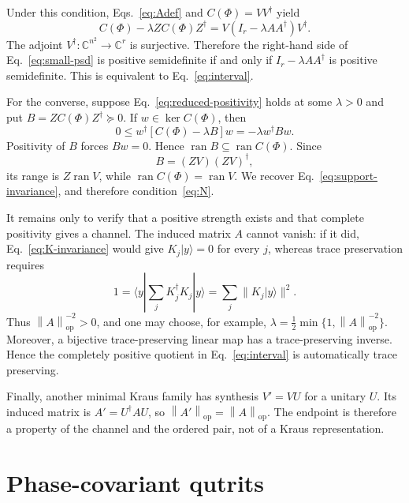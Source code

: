\documentclass[aip,jmp,preprint]{revtex4-2}
\newcommand{\ran}{\operatorname{ran}}
\newcommand{\opnorm}[1]{\left\lVert #1\right\rVert_{\mathrm{op}}}
\begin{document}
Under this condition, Eqs.~\eqref{eq:Adef} and $C(\Phi)=VV^\dagger$ yield
\begin{equation}
 C(\Phi)-\lambda ZC(\Phi)Z^\dagger
 =V(I_r-\lambda AA^\dagger)V^\dagger . \label{eq:small-psd}
\end{equation}
The adjoint $V^\dagger:\mathbb C^{n^2}\to\mathbb C^r$ is surjective.  Therefore the right-hand side of Eq.~\eqref{eq:small-psd} is positive semidefinite if and only if $I_r-\lambda AA^\dagger$ is positive semidefinite.  This is equivalent to Eq.~\eqref{eq:interval}.

For the converse, suppose Eq.~\eqref{eq:reduced-positivity} holds at some $\lambda>0$ and put $B=ZC(\Phi)Z^\dagger\succeq0$.  If $w\in\ker C(\Phi)$, then
\begin{equation}
 0\leq w^\dagger[C(\Phi)-\lambda B]w
 =-\lambda w^\dagger Bw .
\end{equation}
Positivity of $B$ forces $Bw=0$.  Hence $\ran B\subseteq\ran C(\Phi)$.  Since
\begin{equation}
 B=(ZV)(ZV)^\dagger,
\end{equation}
its range is $Z\ran V$, while $\ran C(\Phi)=\ran V$.  We recover Eq.~\eqref{eq:support-invariance}, and therefore condition~\eqref{eq:N}.

It remains only to verify that a positive strength exists and that complete positivity gives a channel.  The induced matrix $A$ cannot vanish: if it did, Eq.~\eqref{eq:K-invariance} would give $K_j|y\rangle=0$ for every $j$, whereas trace preservation requires
\begin{equation}
 1=\langle y|\sum_jK_j^\dagger K_j|y\rangle
 =\sum_j\|K_j|y\rangle\|^2 .
\end{equation}
Thus $\opnorm{A}^{-2}>0$, and one may choose, for example, $\lambda=\tfrac12\min\{1,\opnorm{A}^{-2}\}$.  Moreover, a bijective trace-preserving linear map has a trace-preserving inverse.  Hence the completely positive quotient in Eq.~\eqref{eq:interval} is automatically trace preserving.

Finally, another minimal Kraus family has synthesis $V'=VU$ for a unitary $U$.  Its induced matrix is $A'=U^\dagger AU$, so $\opnorm{A'}=\opnorm{A}$.  The endpoint is therefore a property of the channel and the ordered pair, not of a Kraus representation.

\section{Phase-covariant qutrits}
\end{document}
